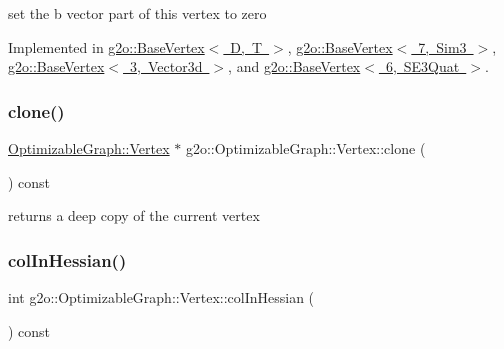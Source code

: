 set the b vector part of this vertex to zero 

Implemented in \mbox{\hyperlink{classg2o_1_1_base_vertex_a144f99c7aa36a100dea65b30793e6d76}{g2o\+::\+Base\+Vertex$<$ D, T $>$}}, \mbox{\hyperlink{classg2o_1_1_base_vertex_a144f99c7aa36a100dea65b30793e6d76}{g2o\+::\+Base\+Vertex$<$ 7, Sim3 $>$}}, \mbox{\hyperlink{classg2o_1_1_base_vertex_a144f99c7aa36a100dea65b30793e6d76}{g2o\+::\+Base\+Vertex$<$ 3, Vector3d $>$}}, and \mbox{\hyperlink{classg2o_1_1_base_vertex_a144f99c7aa36a100dea65b30793e6d76}{g2o\+::\+Base\+Vertex$<$ 6, S\+E3\+Quat $>$}}.

\mbox{\label{classg2o_1_1_optimizable_graph_1_1_vertex_a32e33f86c169e234a0dde54d1309e5e3}} 
\subsubsection{\texorpdfstring{clone()}{clone()}}
{\footnotesize\ttfamily \mbox{\hyperlink{classg2o_1_1_optimizable_graph_1_1_vertex}{Optimizable\+Graph\+::\+Vertex}} $\ast$ g2o\+::\+Optimizable\+Graph\+::\+Vertex\+::clone (\begin{DoxyParamCaption}{ }\end{DoxyParamCaption}) const\hspace{0.3cm}{\ttfamily [virtual]}}



returns a deep copy of the current vertex 

\mbox{\label{classg2o_1_1_optimizable_graph_1_1_vertex_a4d22b2e6832ae2ec040bfc0acb4cabb9}} 
\subsubsection{\texorpdfstring{col\+In\+Hessian()}{colInHessian()}}
{\footnotesize\ttfamily int g2o\+::\+Optimizable\+Graph\+::\+Vertex\+::col\+In\+Hessian (\begin{DoxyParamCaption}{ }\end{DoxyParamCaption}) const\hspace{0.3cm}{\ttfamily [inline]}}



